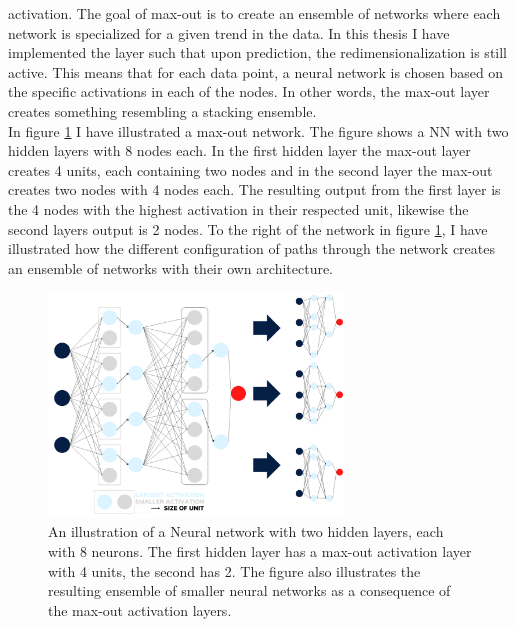activation. The goal of max-out is to create an ensemble of networks where each network is specialized for a given 
trend in the data. In this thesis I have implemented the layer such that upon prediction, the redimensionalization 
is still active. This means that for each data point, a neural network is chosen based on the specific activations in 
each of the nodes. In other words, the max-out layer creates something resembling a stacking ensemble. 
\\
In figure \ref{fig:Max_out} I have illustrated a max-out network. The figure shows a \ac{NN} with two hidden layers
with 8 nodes each. In the first hidden layer the max-out layer creates 4 units, each containing two nodes and in the 
second layer the max-out creates two nodes with 4 nodes each. The resulting output from the first layer is the 
4 nodes with the highest activation in their respected unit, likewise the second layers output is 2 nodes.
To the right of the network in figure \ref{fig:Max_out}, I have illustrated how the different configuration of 
paths through the network creates an ensemble of networks with their own architecture.
\begin{figure}
    \centering
    \includegraphics[width=0.7\textwidth]{Figures/Illustrations/Max_out.png}
    \caption{An illustration of a Neural network with two hidden layers, each with 8 neurons.
    The first hidden layer has a max-out activation layer with 4 units, the second has 2.
    The figure also illustrates  the resulting ensemble of smaller neural networks as a consequence
    of the max-out activation layers. }
    \label{fig:Max_out}
\end{figure}
